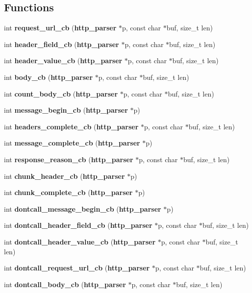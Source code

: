 \subsection*{Functions}
\begin{DoxyCompactItemize}
\item 
int {\bf request\+\_\+url\+\_\+cb} ({\bf http\+\_\+parser} $\ast$p, const char $\ast$buf, size\+\_\+t len)
\item 
int {\bf header\+\_\+field\+\_\+cb} ({\bf http\+\_\+parser} $\ast$p, const char $\ast$buf, size\+\_\+t len)
\item 
int {\bf header\+\_\+value\+\_\+cb} ({\bf http\+\_\+parser} $\ast$p, const char $\ast$buf, size\+\_\+t len)
\item 
int {\bf body\+\_\+cb} ({\bf http\+\_\+parser} $\ast$p, const char $\ast$buf, size\+\_\+t len)
\item 
int {\bf count\+\_\+body\+\_\+cb} ({\bf http\+\_\+parser} $\ast$p, const char $\ast$buf, size\+\_\+t len)
\item 
int {\bf message\+\_\+begin\+\_\+cb} ({\bf http\+\_\+parser} $\ast$p)
\item 
int {\bf headers\+\_\+complete\+\_\+cb} ({\bf http\+\_\+parser} $\ast$p, const char $\ast$buf, size\+\_\+t len)
\item 
int {\bf message\+\_\+complete\+\_\+cb} ({\bf http\+\_\+parser} $\ast$p)
\item 
int {\bf response\+\_\+reason\+\_\+cb} ({\bf http\+\_\+parser} $\ast$p, const char $\ast$buf, size\+\_\+t len)
\item 
int {\bf chunk\+\_\+header\+\_\+cb} ({\bf http\+\_\+parser} $\ast$p)
\item 
int {\bf chunk\+\_\+complete\+\_\+cb} ({\bf http\+\_\+parser} $\ast$p)
\item 
int {\bf dontcall\+\_\+message\+\_\+begin\+\_\+cb} ({\bf http\+\_\+parser} $\ast$p)
\item 
int {\bf dontcall\+\_\+header\+\_\+field\+\_\+cb} ({\bf http\+\_\+parser} $\ast$p, const char $\ast$buf, size\+\_\+t len)
\item 
int {\bf dontcall\+\_\+header\+\_\+value\+\_\+cb} ({\bf http\+\_\+parser} $\ast$p, const char $\ast$buf, size\+\_\+t len)
\item 
int {\bf dontcall\+\_\+request\+\_\+url\+\_\+cb} ({\bf http\+\_\+parser} $\ast$p, const char $\ast$buf, size\+\_\+t len)
\item 
int {\bf dontcall\+\_\+body\+\_\+cb} ({\bf http\+\_\+parser} $\ast$p, const char $\ast$buf, size\+\_\+t len)
\item 

\end{DoxyCompactItemize}
